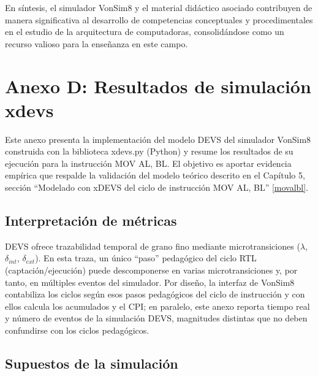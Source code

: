 \documentclass[12pt,oneside]{templates/unerthesis}
\begin{document}
En síntesis, el simulador VonSim8 y el material didáctico asociado contribuyen de manera significativa al desarrollo de competencias conceptuales y procedimentales en el estudio de la arquitectura de computadoras, consolidándose como un recurso valioso para la enseñanza en este campo.

\hypertarget{anexoD}{%
\section{Anexo D: Resultados de simulación xdevs}\label{anexoD}}

Este anexo presenta la implementación del modelo DEVS del simulador VonSim8 construida con la biblioteca xdevs.py (Python) y resume los resultados de su ejecución para la instrucción MOV AL, BL. El objetivo es aportar evidencia empírica que respalde la validación del modelo teórico descrito en el Capítulo 5, sección ``Modelado con xDEVS del ciclo de instrucción MOV AL, BL'' \ref{movalbl}.

\hypertarget{interpretaciuxf3n-de-muxe9tricas}{%
\subsection{Interpretación de métricas}\label{interpretaciuxf3n-de-muxe9tricas}}

DEVS ofrece trazabilidad temporal de grano fino mediante microtransiciones (\(\lambda\), \(\delta_{int}\), \(\delta_{ext}\)). En esta traza, un único ``paso'' pedagógico del ciclo RTL (captación/ejecución) puede descomponerse en varias microtransiciones y, por tanto, en múltiples eventos del simulador. Por diseño, la interfaz de VonSim8 contabiliza los ciclos según esos pasos pedagógicos del ciclo de instrucción y con ellos calcula los acumulados y el CPI; en paralelo, este anexo reporta tiempo real y número de eventos de la simulación DEVS, magnitudes distintas que no deben confundirse con los ciclos pedagógicos.

\hypertarget{supuestos-de-la-simulaciuxf3n}{%
\subsection{Supuestos de la simulación}\label{supuestos-de-la-simulaciuxf3n}}
\end{document}
